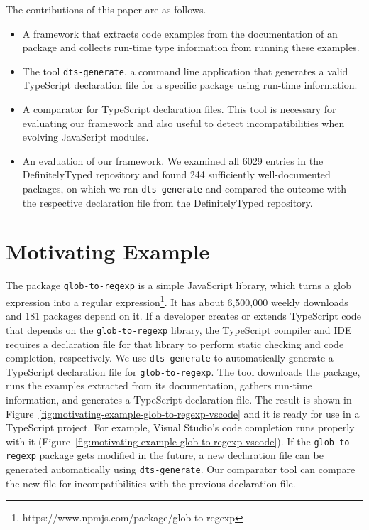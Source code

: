 \documentclass[english,cleveref,autoref,submission]{programming}
\newcommand{\figref}[1]{Figure~\ref{#1}}
\begin{document}
The contributions of this paper are as follows.
\begin{itemize}
\item A framework that extracts code examples from the
  documentation of an \NPM{} package and collects run-time type
  information from running these examples.

\item The tool \texttt{dts-generate}, a command line
  application that generates a valid TypeScript declaration file for a
  specific \NPM{} package using run-time information.

\item A comparator for TypeScript declaration files. This tool is
  necessary for evaluating our framework and also useful to detect
  incompatibilities when evolving JavaScript modules.
\item An evaluation of our framework. We examined all 6029 entries in
  the DefinitelyTyped repository and found 244 sufficiently
  well-documented \NPM{} packages, on which we ran \texttt{dts-generate}
  and compared the outcome with the respective declaration file from the
  DefinitelyTyped repository. 

\end{itemize}

\section{Motivating Example}
\label{sec:motivating-example}
The \NPM{} package \texttt{glob-to-regexp} is a simple JavaScript library, which turns a glob expression into a regular expression\footnote{https://www.npmjs.com/package/glob-to-regexp}. It
has about 6,500,000 weekly downloads and 181 \NPM{} packages depend on it. If
a developer creates or extends TypeScript code that depends on the
\texttt{glob-to-regexp} library, the TypeScript
compiler and IDE requires a declaration file for that library to
perform static checking and code completion, respectively. We 
use \texttt{dts-generate} to automatically generate a TypeScript
declaration file for \texttt{glob-to-regexp}. The tool downloads the \NPM{} 
package, runs the examples extracted from its documentation, gathers
run-time information, and generates a TypeScript declaration
file. The result is 
shown in \figref{fig:motivating-example-glob-to-regexp-vscode} and it is
ready for use in a TypeScript project. For example,  Visual Studio's
code completion runs properly with it
(\figref{fig:motivating-example-glob-to-regexp-vscode}). If the
\texttt{glob-to-regexp} package gets modified in the future, a new declaration
file can be generated automatically using
\texttt{dts-generate}. Our comparator tool can compare the new file
for incompatibilities with the previous declaration file.
\end{document}
